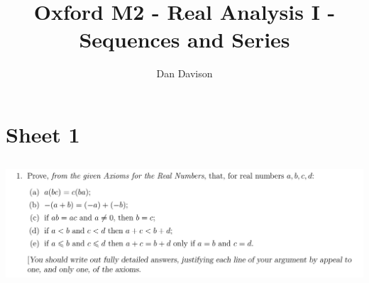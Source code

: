 \documentclass[12pt]{article}
\begin{document}
\title{Oxford M2 - Real Analysis I - Sequences and Series
  } \author{Dan Davison}
\author{}
\date{}
\maketitle

\section{Sheet 1}

\newpage
\subsection{}
\begin{mdframed}
\includegraphics[width=400pt]{img/oxford-M2-analysis-I-1-1.png}
\end{mdframed}
\end{document}
